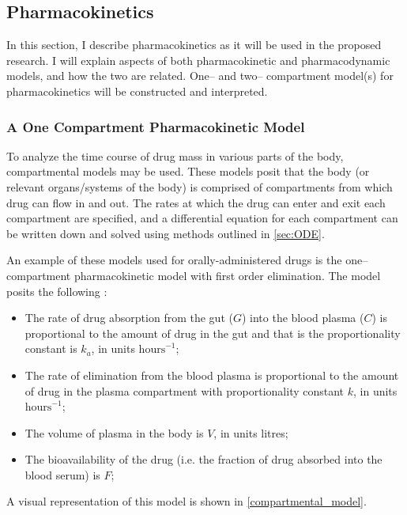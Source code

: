 \subsection{Pharmacokinetics} \label{PKPD}

In this section, I describe pharmacokinetics as it will be used in the proposed research.  I will explain aspects of both pharmacokinetic and pharmacodynamic models, and how the two are related.  One-- and two-- compartment model(s) for pharmacokinetics will be constructed and interpreted.


\subsubsection{A One Compartment Pharmacokinetic Model} 

To analyze the time course of drug mass in various parts of the body, compartmental models may be used.  These models posit that the body (or relevant organs/systems of the body) is comprised of compartments from which drug can flow in and out. The rates at which the drug can enter and exit each compartment are specified, and a differential equation for each compartment can be written down and solved using methods outlined in \cref{sec:ODE}.

An example of these models used for orally-administered drugs is the one--compartment pharmacokinetic model with first order elimination.  The model posits the following \cite{wakefield1992bayesian}:  
%
\begin{itemize}
\item The rate of drug absorption from the gut ($ G  $) into the blood plasma ($ C $) is proportional to the amount of drug in the gut and that is the proportionality constant is $ k_a $, in units $ \text{hours}^{-1} $;

\item The rate of elimination from the blood plasma is proportional to the amount of drug in the plasma compartment with proportionality constant $ k $, in units $ \text{hours}^{-1} $;

\item The volume of plasma in the body is $ V $, in units litres;

\item The bioavailability of the drug (i.e. the fraction of drug absorbed into the blood serum) is $F$;
\end{itemize}
%
 A visual representation of this model is shown in \cref{compartmental_model}.

